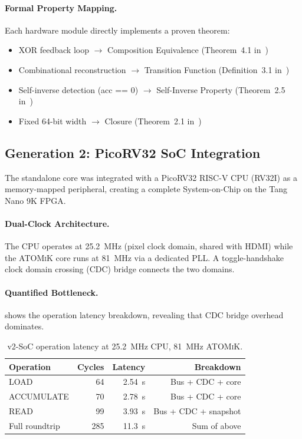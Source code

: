 \documentclass[11pt,letterpaper]{article}
\theoremstyle{plain}
\theoremstyle{definition}
\theoremstyle{remark}
\newcommand{\atomik}{\textsc{ATOMiK}}
\begin{document}
\paragraph{Formal Property Mapping.} Each hardware module directly implements a proven theorem:

\begin{itemize}
    \item XOR feedback loop $\rightarrow$ Composition Equivalence (Theorem~4.1 in~\cite{paper1})
    \item Combinational reconstruction $\rightarrow$ Transition Function (Definition~3.1 in~\cite{paper1})
    \item Self-inverse detection (acc == 0) $\rightarrow$ Self-Inverse Property (Theorem~2.5 in~\cite{paper1})
    \item Fixed 64-bit width $\rightarrow$ Closure (Theorem~2.1 in~\cite{paper1})
\end{itemize}

\subsection{Generation 2: PicoRV32 SoC Integration}
\label{sec:v2soc}

The standalone core was integrated with a PicoRV32 RISC-V CPU (RV32I) as a memory-mapped peripheral, creating a complete System-on-Chip on the Tang Nano 9K FPGA.

\paragraph{Dual-Clock Architecture.} The CPU operates at 25.2~MHz (pixel clock domain, shared with HDMI) while the \atomik{} core runs at 81~MHz via a dedicated PLL. A toggle-handshake clock domain crossing (CDC) bridge connects the two domains.

\paragraph{Quantified Bottleneck.}  shows the operation latency breakdown, revealing that CDC bridge overhead dominates.

\begin{table}[!htbp]
\centering
\caption{v2-SoC operation latency at 25.2~MHz CPU, 81~MHz \atomik{}.}
\label{tab:v2-latency}
\begin{tabular}{@{}lrrr@{}}
\toprule
\textbf{Operation} & \textbf{Cycles} & \textbf{Latency} & \textbf{Breakdown} \\
\midrule
LOAD & 64 & 2.54~\textmu{}s & Bus + CDC + core \\
ACCUMULATE & 70 & 2.78~\textmu{}s & Bus + CDC + core \\
READ & 99 & 3.93~\textmu{}s & Bus + CDC + snapshot \\
Full roundtrip & 285 & 11.3~\textmu{}s & Sum of above \\
\bottomrule
\end{tabular}
\end{table}
\end{document}
